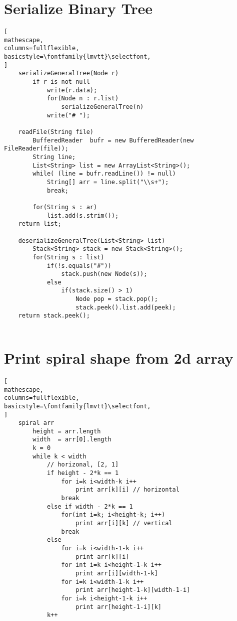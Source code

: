 \documentclass{article}
\begin{document}
\section{Serialize Binary Tree}
\begin{lstlisting}[
mathescape,
columns=fullflexible,
basicstyle=\fontfamily{lmvtt}\selectfont,
]
    serializeGeneralTree(Node r)
        if r is not null
            write(r.data);
            for(Node n : r.list)
                serializeGeneralTree(n)
            write("# ");

    readFile(String file)
        BufferedReader  bufr = new BufferedReader(new FileReader(file));
        String line; 
        List<String> list = new ArrayList<String>();
        while( (line = bufr.readLine()) != null)
            String[] arr = line.split("\\s+");
            break;

        for(String s : ar)
            list.add(s.strim());
    return list;

    deserializeGeneralTree(List<String> list)
        Stack<String> stack = new Stack<String>(); 
        for(String s : list)
            if(!s.equals("#"))
                stack.push(new Node(s));
            else
                if(stack.size() > 1)
                    Node pop = stack.pop();
                    stack.peek().list.add(peek); 
    return stack.peek();
        

\end{lstlisting} 

\section{Print spiral shape from 2d array}
\begin{lstlisting}[
mathescape,
columns=fullflexible,
basicstyle=\fontfamily{lmvtt}\selectfont,
]
    spiral arr
        height = arr.length
        width  = arr[0].length
        k = 0
        while k < width
            // horizonal, [2, 1]
            if height - 2*k == 1
                for i=k i<width-k i++
                    print arr[k][i] // horizontal
                break
            else if width - 2*k == 1
                for(int i=k; i<height-k; i++)
                    print arr[i][k] // vertical 
                break
            else
                for i=k i<width-1-k i++
                    print arr[k][i]
                for int i=k i<height-1-k i++
                    print arr[i][width-1-k]
                for i=k i<width-1-k i++
                    print arr[height-1-k][width-1-i]
                for i=k i<height-1-k i++
                    print arr[height-1-i][k]
            k++
\end{lstlisting} 
\end{document}
